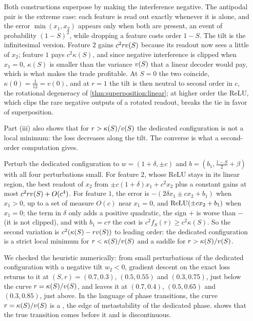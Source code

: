 \begin{refsection}
Both constructions superpose by making the interference negative. The antipodal pair is the extreme case: each feature is read out exactly whenever it is alone, and the error $\min(x_1,x_2)$ appears only when both are present, an event of probability $(1-S)^2$, while dropping a feature costs order $1-S$. The tilt is the infinitesimal version. Feature $2$ gains $c^2rv(S)$ because its readout now sees a little of $x_2$; feature $1$ pays $c^2\kappa(S)$, and since negative interference is clipped when $x_1=0$, $\kappa(S)$ is smaller than the variance $v(S)$ that a linear decoder would pay, which is what makes the trade profitable. At $S=0$ the two coincide, $\kappa(0)=\frac1{12}=v(0)$, and at $r=1$ the tilt is then neutral to second order in $c$, the rotational degeneracy of \cref{thm:superposition:linear}; at higher order the ReLU, which clips the rare negative outputs of a rotated readout, breaks the tie in favor of superposition.

Part (iii) also shows that for $r>\kappa(S)/v(S)$ the dedicated configuration is not a local minimum: the loss decreases along the tilt. The converse is what a second-order computation gives.

\begin{heuristic}
Perturb the dedicated configuration to $w=(1+\delta,\pm c)$ and $b=(b_1,\frac{1-S}2+\beta)$ with all four perturbations small. For feature $2$, whose ReLU stays in its linear region, the best readout of $x_2$ from $\pm c(1+\delta)x_1+c^2x_2$ plus a constant gains at most $c^2rv(S)+O(c^4)$. For feature $1$, the error is $-(2\delta x_1\pm cx_2+b_1)$ when $x_1>0$, up to a set of measure $O(c)$ near $x_1=0$, and $\operatorname{ReLU}(\pm cx_2+b_1)$ when $x_1=0$; the term in $\delta$ only adds a positive quadratic, the sign $+$ is worse than $-$ (it is not clipped), and with $b_1=c\tau$ the cost is $c^2f_S(\tau)\ge c^2\kappa(S)$. So the second variation is $c^2(\kappa(S)-rv(S))$ to leading order: the dedicated configuration is a strict local minimum for $r<\kappa(S)/v(S)$ and a saddle for $r>\kappa(S)/v(S)$.
\end{heuristic}

We checked the heuristic numerically: from small perturbations of the dedicated configuration with a negative tilt $w_2<0$, gradient descent on the exact loss returns to it at $(S,r)=(0.7,0.3)$, $(0.5,0.55)$ and $(0.3,0.75)$, just below the curve $r=\kappa(S)/v(S)$, and leaves it at $(0.7,0.4)$, $(0.5,0.65)$ and $(0.3,0.85)$, just above. In the language of phase transitions, the curve $r=\kappa(S)/v(S)$ is a , the edge of metastability of the dedicated phase.  shows that the true transition comes before it and is discontinuous.


\end{refsection}
